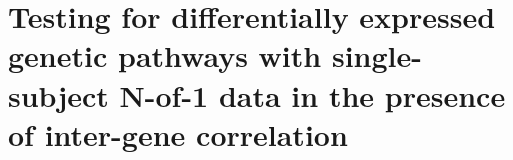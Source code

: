 \chapter{Testing for differentially expressed genetic pathways with single-subject N-of-1 data in the presence of inter-gene correlation}\label{App:C}

